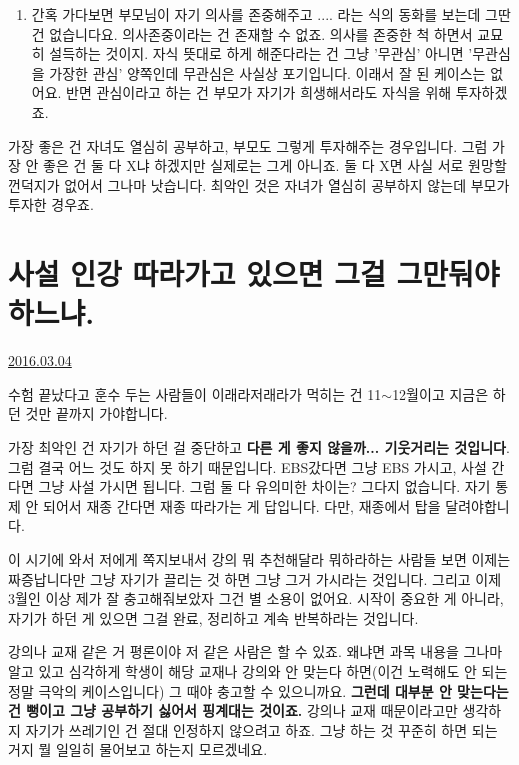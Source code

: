 \begin{enumerate}
    \item 간혹 가다보면 부모님이 자기 의사를 존중해주고 .... 라는 식의 동화를 보는데 그딴 건 없습니다요.
    의사존중이라는 건 존재할 수 없죠. 의사를 존중한 척 하면서 교묘히 설득하는 것이지.
    자식 뜻대로 하게 해준다라는 건 그냥 '무관심' 아니면 '무관심을 가장한 관심' 양쪽인데
    무관심은 사실상 포기입니다. 이래서 잘 된 케이스는 없어요.
    반면 관심이라고 하는 건 부모가 자기가 희생해서라도 자식을 위해 투자하겠죠.
    \vspace{5mm}
\end{enumerate}

가장 좋은 건 자녀도 열심히 공부하고, 부모도 그렇게 투자해주는 경우입니다.
그럼 가장 안 좋은 건 둘 다 X냐 하겠지만 실제로는 그게 아니죠. 둘 다 X면 사실 서로 원망할 껀덕지가 없어서 그나마 낫습니다.
최악인 것은 자녀가 열심히 공부하지 않는데 부모가 투자한 경우죠.
\vspace{5mm}






\section{사설 인강 따라가고 있으면 그걸 그만둬야하느냐.}
\href{https://www.kockoc.com/Apoc/663118}{2016.03.04}

\vspace{5mm}

수험 끝났다고 훈수 두는 사람들이 이래라저래라가 먹히는 건 11$\sim$12월이고
지금은 하던 것만 끝까지 가야합니다.
\vspace{5mm}

가장 최악인 건 자기가 하던 걸 중단하고 \textbf{다른 게 좋지 않을까... 기웃거리는 것입니다}. 그럼 결국 어느 것도 하지 못 하기 때문입니다.
EBS갔다면 그냥 EBS 가시고, 사설 간다면 그냥 사설 가시면 됩니다. 그럼 둘 다 유의미한 차이는? 그다지 없습니다.
자기 통제 안 되어서 재종 간다면 재종 따라가는 게 답입니다. 다만, 재종에서 탑을 달려야합니다.
\vspace{5mm}

이 시기에 와서 저에게 쪽지보내서 강의 뭐 추천해달라 뭐하라하는 사람들 보면 이제는 짜증납니다만
그냥 자기가 끌리는 것 하면 그냥 그거 가시라는 것입니다. 그리고 이제 3월인 이상 제가 잘 충고해줘보았자 그건 별 소용이 없어요.
시작이 중요한 게 아니라, 자기가 하던 게 있으면 그걸 완료, 정리하고 계속 반복하라는 것입니다.
\vspace{5mm}

강의나 교재 같은 거 평론이야 저 같은 사람은 할 수 있죠. 왜냐면 과목 내용을 그나마 알고 있고
심각하게 학생이 해당 교재나 강의와 안 맞는다 하면(이건 노력해도 안 되는 정말 극악의 케이스입니다) 그 때야 충고할 수 있으니까요.
\textbf{그런데 대부분 안 맞는다는 건 뻥이고 그냥 공부하기 싫어서 핑계대는 것이죠.}
강의나 교재 때문이라고만 생각하지 자기가 쓰레기인 건 절대 인정하지 않으려고 하죠.
그냥 하는 것 꾸준히 하면 되는 거지 뭘 일일히 물어보고 하는지 모르겠네요.
\vspace{5mm}

